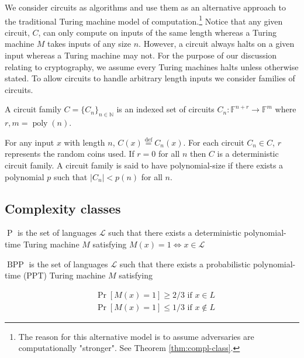 We consider circuits as algorithms and use them as an alternative approach to the traditional Turing machine model of computation.\footnote{The reason for this alternative model is to assume adversaries are computationally "stronger". See Theorem \ref{thm:compl-class}.} Notice that any given circuit, $C$, can only compute on inputs of the same length whereas a Turing machine $M$ takes inputs of any size $n$. However, a circuit always halts on a given input whereas a Turing machine may not. For the purpose of our discussion relating to cryptography, we assume every Turing machines halts unless otherwise stated. To allow circuits to handle arbitrary length inputs we consider families of circuits.  

\begin{definition}
A circuit family $C = \{C_n\}_{n \in \mathbb{N}}$ is an indexed set of circuits $C_n \colon \mathbb{F}^{n + r} \to \mathbb{F}^m$ where $r,m = \operatorname{poly}(n)$.
\end{definition}

For any input $x$ with length $n$, $C(x) \stackrel{\mathrm{def}}{=} C_n(x)$. For each circuit $C_n \in C$, $r$ represents the random coins used. If $r = 0$ for all $n$ then $C$ is a deterministic circuit family. A circuit family is said to have polynomial-size if there exists a polynomial $p$ such that $|C_n| < p(n)$ for all $n$. 

\subsection*{Complexity classes}\label{subsec:Complexity classes}
\begin{definition}
$\operatorname{P}$ is the set of languages $\mathscr{L}$ such that there exists a deterministic polynomial-time Turing machine $M$ satisfying $M(x) = 1 \iff x \in \mathscr{L}$ 
\end{definition}

\begin{definition}
$\operatorname{BPP}$ is the set of languages $\mathscr{L}$ such that there exists a probabilistic polynomial-time (PPT) Turing machine $M$ satisfying

\begin{align*}
& \operatorname{Pr}[M(x)=1] \geq 2/3 \text{ if $x \in L$}
\\
& \operatorname{Pr}[M(x)=1] \leq 1/3 \text{ if $x \notin L$}
\end{align*}
\end{definition}

